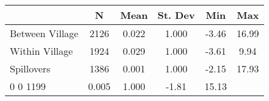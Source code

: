 \begin{tabular}{l*{5}{c}}\hline&\multicolumn{1}{c}{N}&\multicolumn{1}{c}{Mean}&\multicolumn{1}{c}{St. Dev}&\multicolumn{1}{c}{Min}&\multicolumn{1}{c}{Max}\\ \hline 
Between Village & 2126 & 0.022 & 1.000 & -3.46 & 16.99 \\
Within Village & 1924 & 0.029 & 1.000 & -3.61 & 9.94 \\
Spillovers & 1386 & 0.001 & 1.000 & -2.15 & 17.93 \\
0 0 1199 & 0.005 & 1.000 & -1.81 & 15.13 \\
\hline \end{tabular}
